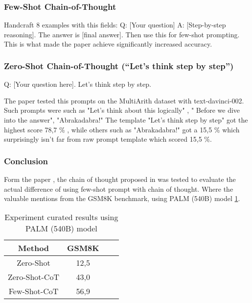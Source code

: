 \subsubsection{Few-Shot Chain-of-Thought \cite{chainofthought}}
Handcraft 8 examples with this fields:
Q: [Your question]
A: [Step-by-step reasoning]. The answer is [final answer].
Then use this for few-shot prompting. This is what made the paper achieve significantly increased accuracy.

\subsubsection{Zero-Shot Chain-of-Thought (“Let’s think step by step”) \cite{chainofzero}}
Q: [Your question here].  
Let’s think step by step.


The paper \cite{chainofzero} tested this prompts on the MultiArith dataset with text-davinci-002. Such prompts were such as "Let’s think about this logically" , " Before we dive into the answer", "Abrakadabra!"
The template "Let's think step by step" got the highest score 78,7 \% , while others such as "Abrakadabra!" got a 15,5 \% which surprisingly isn't far from raw prompt template which scored 15,5 \%.

\subsubsection{Conclusion}
Form the paper \cite{chainofzero}, the chain of thought proposed in \cite{chainofthought} was tested to evaluate the actual difference of using few-shot prompt with chain of thought.
Where the valuable mentions from the GSM8K benchmark, using PALM (540B) model \ref{tab:chainofzero}.

\begin{table}[h!]
    \centering
    \begin{tabular}{|c|c|cc}
        \hline
        Method & GSM8K\\
        \hline
        Zero-Shot & 12,5 \\
        \hline
        Zero-Shot-CoT \cite{chainofzero} & 43,0 \\
        \hline
        Few-Shot-CoT \cite{chainofthought} & 56,9 \\
        \hline
    \end{tabular}
    \caption{Experiment curated results using PALM (540B)  model \cite{chainofzero}}
    \label{tab:chainofzero}
\end{table}

